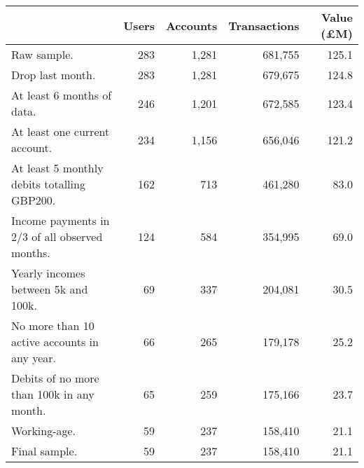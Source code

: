 \begin{tabular}{lrrrr}
\toprule
                                               & Users & Accounts & Transactions & Value (\pounds M) \\
\midrule
                                   Raw sample. &   283 &    1,281 &      681,755 &             125.1 \\
                              Drop last month. &   283 &    1,281 &      679,675 &             124.8 \\
                    At least 6 months of data. &   246 &    1,201 &      672,585 &             123.4 \\
                 At least one current account. &   234 &    1,156 &      656,046 &             121.2 \\
   At least 5 monthly debits totalling GBP200. &   162 &      713 &      461,280 &              83.0 \\
Income payments in 2/3 of all observed months. &   124 &      584 &      354,995 &              69.0 \\
           Yearly incomes between 5k and 100k. &    69 &      337 &      204,081 &              30.5 \\
  No more than 10 active accounts in any year. &    66 &      265 &      179,178 &              25.2 \\
     Debits of no more than 100k in any month. &    65 &      259 &      175,166 &              23.7 \\
                                  Working-age. &    59 &      237 &      158,410 &              21.1 \\
                                 Final sample. &    59 &      237 &      158,410 &              21.1 \\
\bottomrule
\end{tabular}
